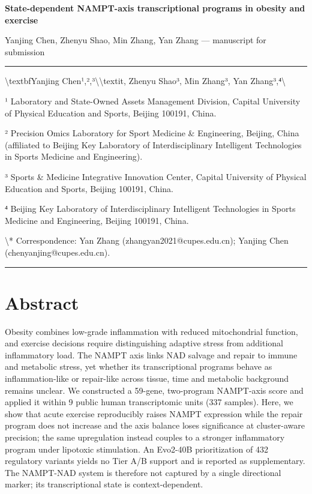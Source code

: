 \documentclass[11pt]{article}
\begin{document}
\begin{center}{\Large\bfseries State-dependent NAMPT-axis transcriptional programs in obesity and exercise}\end{center}
\begin{center}Yanjing Chen, Zhenyu Shao, Min Zhang, Yan Zhang --- manuscript for submission\end{center}
\vspace{4pt}\hrule\vspace{8pt}
\textbackslash{}textbf{Yanjing Chen¹,²,³\textbackslash{}\textbackslash{}textit{, Zhenyu Shao³, Min Zhang³, Yan Zhang³,⁴\textbackslash{}}}

¹ Laboratory and State-Owned Assets Management Division, Capital University of Physical Education and Sports, Beijing 100191, China.

² Precision Omics Laboratory for Sport Medicine \& Engineering, Beijing, China (affiliated to Beijing Key Laboratory of Interdisciplinary Intelligent Technologies in Sports Medicine and Engineering).

³ Sports \& Medicine Integrative Innovation Center, Capital University of Physical Education and Sports, Beijing 100191, China.

⁴ Beijing Key Laboratory of Interdisciplinary Intelligent Technologies in Sports Medicine and Engineering, Beijing 100191, China.

\textbackslash{}* Correspondence: Yan Zhang (zhangyan2021@cupes.edu.cn); Yanjing Chen (chenyanjing@cupes.edu.cn).

\vspace{4pt}\hrule\vspace{8pt}
\section*{Abstract}
Obesity combines low-grade inflammation with reduced mitochondrial function, and exercise decisions require distinguishing adaptive stress from additional inflammatory load. The NAMPT axis links NAD salvage and repair to immune and metabolic stress, yet whether its transcriptional programs behave as inflammation-like or repair-like across tissue, time and metabolic background remains unclear. We constructed a 59-gene, two-program NAMPT-axis score and applied it within 9 public human transcriptomic units (337 samples). Here, we show that acute exercise reproducibly raises NAMPT expression while the repair program does not increase and the axis balance loses significance at cluster-aware precision; the same upregulation instead couples to a stronger inflammatory program under lipotoxic stimulation. An Evo2-40B prioritization of 432 regulatory variants yields no Tier A/B support and is reported as supplementary. The NAMPT-NAD system is therefore not captured by a single directional marker; its transcriptional state is context-dependent.
\end{document}
